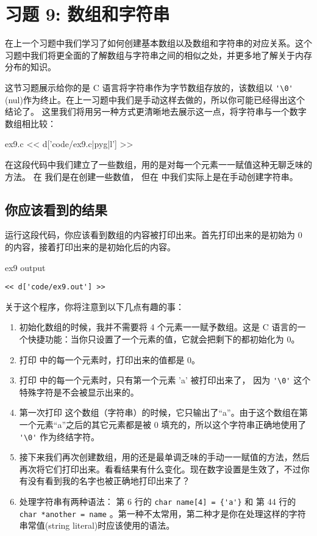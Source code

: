 \chapter{习题 9: 数组和字符串}

在上一个习题中我们学习了如何创建基本数组以及数组和字符串的对应关系。这个习题中我们将更全面的了解数组与字符串之间的相似之处，并更多地了解关于内存分布的知识。

这节习题展示给你的是 C 语言将字符串作为字节数组存放的，该数组以 \verb|'\0'| (nul)作为终止。在上一习题中我们是手动这样去做的，所以你可能已经得出这个结论了。 这里我们将用另一种方式更清晰地去展示这一点，将字符串与一个数字数组相比较：

\begin{code}{ex9.c}
<< d['code/ex9.c|pyg|l'] >>
\end{code}

在这段代码中我们建立了一些数组，用的是对每一个元素一一赋值这种无聊乏味的方法。 在  我们是在创建一些数值， 但在  中我们实际上是在手动创建字符串。


\section{你应该看到的结果}

运行这段代码，你应该看到数组的内容被打印出来。首先打印出来的是初始为 0 的内容，接着打印出来的是初始化后的内容。

\begin{code}{ex9 output}
\begin{lstlisting}
<< d['code/ex9.out'] >>
\end{lstlisting}
\end{code}

关于这个程序，你将注意到以下几点有趣的事：

\begin{enumerate}
\item 初始化数组的时候，我并不需要将 4 个元素一一赋予数组。这是 C 语言的一个快捷功能：当你只设置了一个元素的值，它就会把剩下的都初始化为 0。
\item 打印  中的每一个元素时，打印出来的值都是 0。
\item 打印  中的每一个元素时，只有第一个元素 'a' 被打印出来了， 因为 \verb|'\0'| 这个特殊字符是不会被显示出来的。 
\item 第一次打印  这个数组（字符串）的时候，它只输出了“a”。由于这个数组在第一个元素“a”之后的其它元素都是被 0 填充的，所以这个字符串正确地使用了 \verb|'\0'| 作为终结字符。
\item 接下来我们再次创建数组，用的还是最单调乏味的手动一一赋值的方法，然后再次将它们打印出来。看看结果有什么变化。现在数字设置是生效了，不过你有没有看到我的名字也被正确地打印出来了？
\item 处理字符串有两种语法： 第 6 行的 \verb|char name[4] = {'a'}| 和 第 44 行的 \verb|char *another = name| 。第一种不太常用，第二种才是你在处理这样的字符串常值(string literal)时应该使用的语法。
\end{enumerate}

